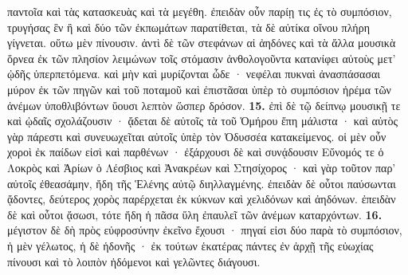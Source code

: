 \documentclass[a4paper, 11pt, oneside, polutonikogreek, german]{article}
\begin{document}
παντοῖα καὶ τὰς κατασκευὰς καὶ τὰ μεγέθη. ἐπειδὰν οὖν παρίῃ τις ἐς τὸ συμπόσιον, τρυγήσας ἓν ἢ καὶ δύο τῶν ἐκπωμάτων παρατίθεται, τὰ δὲ αὐτίκα οἴνου πλήρη γίγνεται. οὕτω μὲν πίνουσιν. ἀντὶ δὲ τῶν στεφάνων αἱ ἀηδόνες καὶ τὰ ἄλλα μουσικὰ ὄρνεα ἐκ τῶν πλησίον λειμώνων τοῖς στόμασιν ἀνθολογοῦντα κατανίφει αὐτοὺς μετ' ᾠδῆς ὑπερπετόμενα. καὶ μὴν καὶ μυρίζονται ὧδε · νεφέλαι πυκναὶ ἀνασπάσασαι μύρον ἐκ τῶν πηγῶν καὶ τοῦ ποταμοῦ καὶ ἐπιστᾶσαι ὑπὲρ τὸ συμπόσιον ἠρέμα τῶν ἀνέμων ὑποθλιβόντων ὕουσι λεπτὸν ὥσπερ δρόσον. \textbf{15.} ἐπὶ δὲ τῷ δείπνῳ μουσικῇ τε καὶ ᾠδαῖς σχολάζουσιν · ᾄδεται δὲ αὐτοῖς τὰ τοῦ Ὁμήρου ἔπη μάλιστα · καὶ αὐτὸς γὰρ πάρεστι καὶ συνευωχεῖται αὐτοῖς ὑπὲρ τὸν Ὀδυσσέα κατακείμενος. οἱ μὲν οὖν χοροὶ ἐκ παίδων εἰσὶ καὶ παρθένων · ἐξάρχουσι δὲ καὶ συνᾴδουσιν Εὔνομός τε ὁ Λοκρὸς καὶ Ἀρίων ὁ Λέσβιος καὶ Ἀνακρέων καὶ Στησίχορος · καὶ γὰρ τοῦτον παρ' αὐτοῖς ἐθεασάμην, ἤδη τῆς Ἑλένης αὐτῷ διηλλαγμένης. ἐπειδὰν δὲ οὗτοι παύσωνται ᾄδοντες, δεύτερος χορὸς παρέρχεται ἐκ κύκνων καὶ χελιδόνων καὶ ἀηδόνων. ἐπειδὰν δὲ καὶ οὗτοι ᾄσωσι, τότε ἤδη ἡ πᾶσα ὕλη ἐπαυλεῖ τῶν ἀνέμων καταρχόντων. \textbf{16.} μέγιστον δὲ δὴ πρὸς εὐφροσύνην ἐκεῖνο ἔχουσι · πηγαί εἰσι δύο παρὰ τὸ συμπόσιον, ἡ μὲν γέλωτος, ἡ δὲ ἡδονῆς · ἐκ τούτων ἑκατέρας πάντες ἐν ἀρχῇ τῆς εὐωχίας πίνουσι καὶ τὸ λοιπὸν ἡδόμενοι καὶ γελῶντες διάγουσι.
\end{document}
